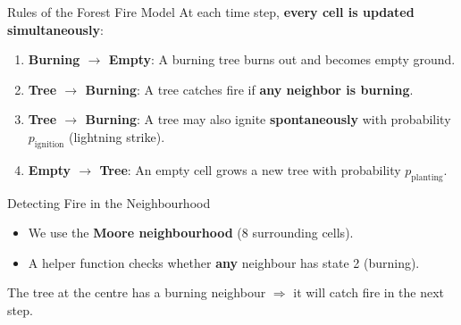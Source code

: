 \begin{frame}{Rules of the Forest Fire Model}
  At each time step, \textbf{every cell is updated simultaneously}:
  \vfill
  \begin{enumerate}
    \item \textbf{Burning $\to$ Empty}: A burning tree burns out and becomes empty ground.
    \item \textbf{Tree $\to$ Burning}: A tree catches fire if \textbf{any neighbor is burning}.
    \item \textbf{Tree $\to$ Burning}: A tree may also ignite \textbf{spontaneously} with probability $p_{\text{ignition}}$ (lightning strike).
    \item \textbf{Empty $\to$ Tree}: An empty cell grows a new tree with probability $p_{\text{planting}}$.
  \end{enumerate}
  \vfill
  \begin{center}
  \end{center}
\end{frame}

\begin{frame}{Detecting Fire in the Neighbourhood}
  \begin{itemize}
    \item We use the \textbf{Moore neighbourhood} (8 surrounding cells).
    \item A helper function checks whether \textbf{any} neighbour has state 2 (burning).
  \end{itemize}
  \vfill
  \begin{center}
  \end{center}
  \small
  The tree at the centre has a burning neighbour $\Rightarrow$ it will catch fire in the next step.
\end{frame}

